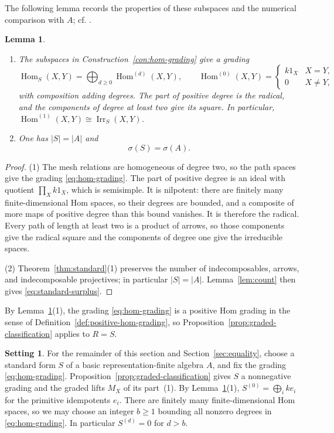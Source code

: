 \documentclass[a4paper,reqno,10pt]{amsart}
\newtheorem{lemma}[theorem]{Lemma}
\theoremstyle{definition}
\newtheorem{setting}[theorem]{Setting}
\numberwithin{equation}{section}
\DeclareMathOperator{\Hom}{Hom}
\DeclareMathOperator{\Irr}{Irr}
\begin{document}
The following lemma records the properties of these subspaces and the
numerical comparison with \(A\); cf. \cite[Section~5.1]{BG}.
\begin{lemma}\label{lem:standard-grading}
\begin{enumerate}
\item The subspaces in Construction~\ref{con:hom-grading} give a grading
\begin{equation}\label{eq:hom-grading}
 \Hom_S(X,Y)=\bigoplus_{d\geq0}\Hom^{(d)}(X,Y),\qquad
 \Hom^{(0)}(X,Y)=
 \begin{cases}k1_X&X=Y,\\0&X\ne Y,\end{cases}
\end{equation}
with composition adding degrees. The part of positive degree is the radical,
and the components of degree at least two give its square. In particular,
\(\Hom^{(1)}(X,Y)\cong\Irr_S(X,Y)\).
\item One has \(|S|=|A|\) and
\begin{equation}\label{eq:standard-surplus}
 \sigma(S)=\sigma(A).
\end{equation}
\end{enumerate}
\end{lemma}
\begin{proof}
(1) The mesh relations are homogeneous of degree two, so the path spaces
give the grading \eqref{eq:hom-grading}. The part of positive degree is an
ideal with quotient \(\prod_X k1_X\), which is semisimple. It is
nilpotent: there are finitely many finite-dimensional Hom spaces, so their
degrees are bounded, and a composite of more maps of positive degree than
this bound vanishes. It is therefore the radical. Every path of length at least two is a product of arrows, so
those components give the radical square and the components of degree one
give the irreducible spaces.

(2) Theorem~\ref{thm:standard}(1) preserves the number of indecomposables,
arrows, and indecomposable projectives; in particular \(|S|=|A|\). Lemma~\ref{lem:count} then gives
\eqref{eq:standard-surplus}.
\end{proof}

By Lemma~\ref{lem:standard-grading}(1), the grading \eqref{eq:hom-grading}
is a positive Hom grading in the sense of
Definition~\ref{def:positive-hom-grading}, so
Proposition~\ref{prop:graded-classification} applies to \(R=S\).
\begin{setting}\label{set:grading}
For the remainder of this section and Section~\ref{sec:equality}, choose a standard
form \(S\) of a basic representation-finite algebra \(A\), and fix the grading
\eqref{eq:hom-grading}. Proposition~\ref{prop:graded-classification} gives
\(S\) a nonnegative grading and the graded lifts \(M_X\) of its part~(1).
By Lemma~\ref{lem:standard-grading}(1), \(S^{(0)}=\bigoplus_i ke_i\) for the
primitive idempotents \(e_i\).
There are finitely many finite-dimensional Hom spaces, so we may choose
an integer \(b\geq1\) bounding all nonzero degrees in
\eqref{eq:hom-grading}. In particular \(S^{(d)}=0\)
for \(d>b\).
\end{setting}
\end{document}
